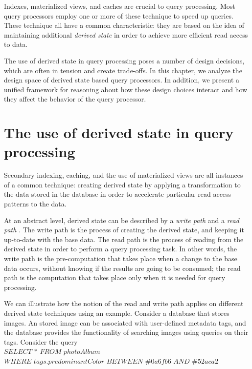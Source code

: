 Indexes, materialized views, and caches are crucial to query processing.
Most query processors employ one or more of these technique to speed up queries.
These technique all have a common characteristic:
they are based on the idea of maintaining additional \textit{derived state} in order to achieve more efficient read
access to data.

The use of derived state in query processing poses a number of design decisions,
which are often in tension and create trade-offs.
In this chapter, we analyze the design space of derived state based query processors.
In addition, we present a unified framework for reasoning about how these design choices interact
and how they affect the behavior of the query processor.


\section{The use of derived state in query processing}

Secondary indexing, caching, and the use of materialized views are all instances of a common technique:
creating derived state by applying a transformation to the data stored in the database in order to accelerate particular
read access patterns to the data.

At an abstract level, derived state can be described by a \textit{write path} and a \textit{read path}
\cite{kleppmann:designing}.
The write path is the process of creating the derived state, and keeping it up-to-date with the base data.
The read path is the process of reading from the derived state in order to perform a query processing task.
In other words, the write path is the pre-computation that takes place when a change to the base data occurs,
without knowing if the results are going to be consumed;
the read path is the computation that takes place only when it is needed for query processing.

\medskip

We can illustrate how the notion of the read and write path applies on different derived state techniques using an example.
Consider a database that stores images.
An stored image can be associated with user-defined metadata tags, and the database provides the functionality of searching
images using queries on their tags.
Consider the query \\

\noindent
$SELECT$ $*$ $FROM$ $photoAlbum$ \\
$WHERE$ $tags.predominantColor$ $BETWEEN$ $\#0a6fb6$ $AND$ $\#52aca2$ \\

